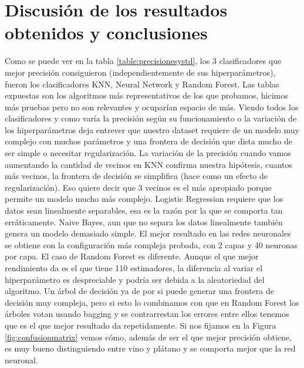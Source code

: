 \documentclass{esannV2}
\begin{document}
\section{Discusión de los resultados obtenidos y conclusiones}\label{section:resultsAnal}
Como se puede ver en la tabla \ref{table:precisionesystd}, los 3 clasificadores que mejor precisión consiguieron (independientemente de sus hiperparámetros), fueron los clasificadores KNN, Neural Network y Random Forest. Las tablas expuestas son los algoritmos más representativos de los que probamos, hicimos más pruebas pero no son relevantes y ocuparían espacio de más.
\newline\newline
Viendo todos los clasificadores y como varía la precisión según su funcionamiento o la variación de los hiperparámetros deja entrever que nuestro dataset requiere de un modelo muy complejo con muchos parámetros y una frontera de decisión que dista mucho de ser simple o necesitar regularización.
\newline\newline
La variación de la precisión cuando vamos aumentando la cantidad de vecinos en KNN confirma nuestra hipótesis, cuantos más vecinos, la frontera de decisión se simplifica (hace como un efecto de regularización). Eso quiere decir que 3 vecinos es el más apropiado porque permite un modelo mucho más complejo.
\newline\newline
Logistic Regression requiere que los datos sean linealmente separables, esa es la razón por la que se comporta tan erráticamente. Naive Bayes, aun que no separa los datos linealmente también genera un modelo demasiado simple.
\newline
El mejor resultado en las redes neuronales se obtiene con la configuración más compleja probada, con 2 capas y 40 neuronas por capa.
\newline\newline
El caso de Random Forest es diferente. Aunque el que mejor rendimiento da es el que tiene 110 estimadores, la diferencia al variar el hiperparámetro es despreciable y podría ser debida a la aleatoriedad del algoritmo. Un árbol de decisión ya de por si puede generar una frontera de decisión muy compleja, pero si esto lo combinamos con que en Random Forest los árboles votan usando bagging y se contrarrestan los errores entre ellos tenemos que es el que mejor resultado da repetidamente. Si nos fijamos en la Figura \ref{fig:confusionmatrix} vemos cómo, además de ser el que mejor precisión obtiene, es muy bueno distinguiendo entre vino y plátano y se comporta mejor que la red neuronal.
\end{document}
